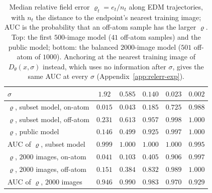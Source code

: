 \documentclass{article} %
\theoremstyle{plain}
\theoremstyle{definition}
\theoremstyle{remark}
\begin{document}
\begin{table}[t]
\centering\small
\begin{tabular}{@{}lccccc@{}}
\toprule
$\sigma$ & $1.92$ & $0.585$ & $0.140$ & $0.023$ & $0.002$\\
\midrule
$\varrho$, subset model, on-atom & $0.015$ & $0.043$ & $0.185$ & $0.725$ & $0.988$\\
$\varrho$, subset model, off-atom & $0.231$ & $0.613$ & $0.957$ & $0.998$ & $1.000$\\
$\varrho$, public model & $0.146$ & $0.499$ & $0.925$ & $0.997$ & $1.000$\\
AUC of $\varrho$, subset model & $0.999$ & $1.000$ & $1.000$ & $1.000$ & $0.995$\\
\midrule
$\varrho$, $2000$ images, on-atom & $0.041$ & $0.103$ & $0.405$ & $0.906$ & $0.997$\\
$\varrho$, $2000$ images, off-atom & $0.151$ & $0.384$ & $0.832$ & $0.989$ & $1.000$\\
AUC of $\varrho$, $2000$ images & $0.946$ & $0.990$ & $0.983$ & $0.970$ & $0.929$\\
\bottomrule
\end{tabular}
\caption{Median relative field error $\varrho_t=e_t/n_t$ along EDM trajectories, with $n_t$ the
distance to the endpoint's nearest training image; AUC is the probability that an off-atom
sample has the larger $\varrho$. Top: the first $500$-image model ($41$ off-atom samples) and the
public model; bottom: the balanced $2000$-image model ($501$ off-atom of $1000$). Anchoring at the nearest training image of $D_\theta(x,\sigma)$
instead, which uses no information after $\sigma$, gives the same AUC at every $\sigma$
(Appendix~\ref{app:relerr-exp}).}
\label{tab:edm-rho}
\end{table}
\end{document}
